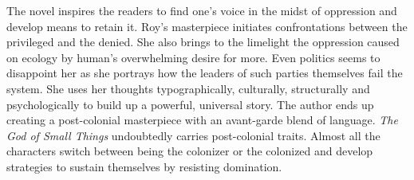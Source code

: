 The novel inspires the readers to find one’s voice in the midst of oppression and develop means to retain it. Roy’s masterpiece initiates confrontations between the privileged and the denied. She also brings to the limelight the oppression caused on ecology by human’s overwhelming desire for more. Even politics seems to disappoint her as she portrays how the leaders of such parties themselves fail the system. She uses her thoughts typographically, culturally, structurally and psychologically to build up a powerful, universal story. The author ends up creating a post-colonial masterpiece with an avant-garde blend of language. \emph{The God of Small Things }undoubtedly carries post-colonial traits. Almost all the characters switch between being the colonizer or the colonized and develop strategies to sustain themselves by resisting domination.





